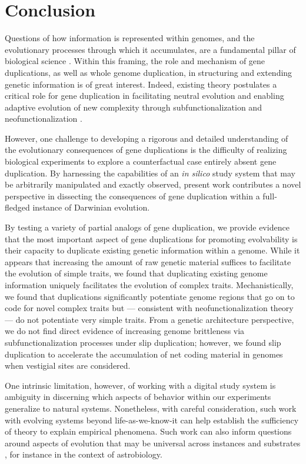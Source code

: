 \section{Conclusion} \label{sec:conclusion}

Questions of how information is represented within genomes, and the evolutionary processes through which it accumulates, are a fundamental pillar of biological science \citep{adami2024evolution}.
Within this framing, the role and mechanism of gene duplications, as well as whole genome duplication, in structuring and extending genetic information is of great interest.
Indeed, existing theory postulates a critical role for gene duplication in facilitating neutral evolution and enabling adaptive evolution of new complexity through subfunctionalization and neofunctionalization \citep{ohno1970evolution}.

However, one challenge to developing a rigorous and detailed understanding of the evolutionary consequences of gene duplications is the difficulty of realizing biological experiments to explore a counterfactual case entirely absent gene duplication.
By harnessing the capabilities of an \textit{in silico} study system that may be arbitrarily manipulated and exactly observed, present work contributes a novel perspective in dissecting the consequences of gene duplication within a full-fledged instance of Darwinian evolution.

By testing a variety of partial analogs of gene duplication, we provide evidence that the most important aspect of gene duplications for promoting evolvability is their capacity to duplicate existing genetic information within a genome.
While it appears that increasing the amount of raw genetic material suffices to facilitate the evolution of simple traits, we found that duplicating existing genome information uniquely facilitates the evolution of complex traits.
Mechanistically, we found that duplications significantly potentiate genome regions that go on to code for novel complex traits but --- consistent with neofunctionalization theory --- do not potentiate very simple traits.
From a genetic architecture perspective, we do not find direct evidence of increasing genome brittleness via subfunctionalization processes under slip duplication; however, we found slip duplication to accelerate the accumulation of net coding material in genomes when vestigial sites are considered.

One intrinsic limitation, however, of working with a digital study system is ambiguity in discerning which aspects of behavior within our experiments generalize to natural systems.
Nonetheless, with careful consideration, such work with evolving systems beyond life-as-we-know-it can help establish the sufficiency of theory to explain empirical phenomena.
Such work can also inform questions around aspects of evolution that may be universal across instances and substrates \citep{dorin2024what}, for instance in the context of astrobiology.

